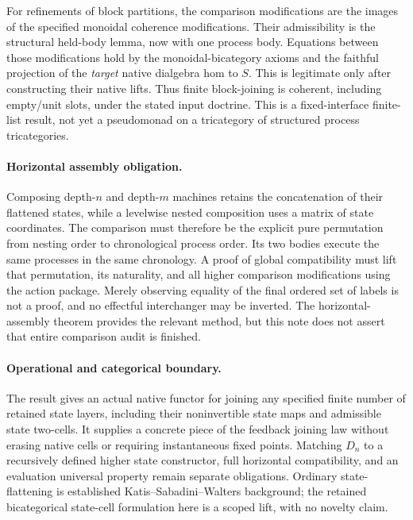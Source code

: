 \documentclass{article}
\begin{document}
For refinements of block partitions, the comparison modifications are the images of the specified monoidal coherence modifications. Their admissibility is the structural held-body lemma, now with one process body. Equations between those modifications hold by the monoidal-bicategory axioms and the faithful projection of the \emph{target} native dialgebra hom to $S$. This is legitimate only after constructing their native lifts. Thus finite block-joining is coherent, including empty/unit slots, under the stated input doctrine. This is a fixed-interface finite-list result, not yet a pseudomonad on a tricategory of structured process tricategories.

\paragraph{Horizontal assembly obligation.} Composing depth-$n$ and depth-$m$ machines retains the concatenation of their flattened states, while a levelwise nested composition uses a matrix of state coordinates. The comparison must therefore be the explicit pure permutation from nesting order to chronological process order. Its two bodies execute the same processes in the same chronology. A proof of global compatibility must lift that permutation, its naturality, and all higher comparison modifications using the action package. Merely observing equality of the final ordered set of labels is not a proof, and no effectful interchanger may be inverted. The horizontal-assembly theorem provides the relevant method, but this note does not assert that entire comparison audit is finished.

\paragraph{Operational and categorical boundary.} The result gives an actual native functor for joining any specified finite number of retained state layers, including their noninvertible state maps and admissible state two-cells. It supplies a concrete piece of the feedback joining law without erasing native cells or requiring instantaneous fixed points. Matching $D_n$ to a recursively defined higher state constructor, full horizontal compatibility, and an evaluation universal property remain separate obligations. Ordinary state-flattening is established Katis--Sabadini--Walters background; the retained bicategorical state-cell formulation here is a scoped lift, with no novelty claim.
\end{document}
